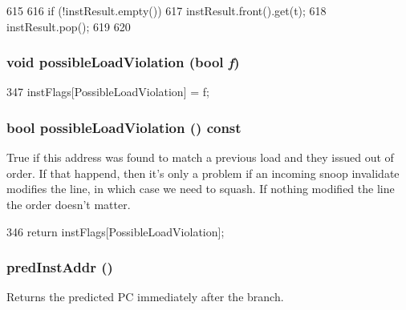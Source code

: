 \begin{DoxyCode}
615     {
616         if (!instResult.empty()) {
617             instResult.front().get(t);
618             instResult.pop();
619         }
620     }
\end{DoxyCode}
\hypertarget{classBaseDynInst_a7734c4cb05e0d0855b9cc931cfbf0166}{
\subsubsection[{possibleLoadViolation}]{\setlength{\rightskip}{0pt plus 5cm}void possibleLoadViolation (bool {\em f})}}
\label{classBaseDynInst_a7734c4cb05e0d0855b9cc931cfbf0166}



\begin{DoxyCode}
347 { instFlags[PossibleLoadViolation] = f; }
\end{DoxyCode}
\hypertarget{classBaseDynInst_afa40abf76b073fc08641ac2b8a9f96cd}{
\subsubsection[{possibleLoadViolation}]{\setlength{\rightskip}{0pt plus 5cm}bool possibleLoadViolation () const}}
\label{classBaseDynInst_afa40abf76b073fc08641ac2b8a9f96cd}
True if this address was found to match a previous load and they issued out of order. If that happend, then it's only a problem if an incoming snoop invalidate modifies the line, in which case we need to squash. If nothing modified the line the order doesn't matter. 


\begin{DoxyCode}
346 { return instFlags[PossibleLoadViolation]; }
\end{DoxyCode}
\hypertarget{classBaseDynInst_aaf7104129d287861faf7fe235f4116e7}{
\subsubsection[{predInstAddr}]{ predInstAddr ()}}
\label{classBaseDynInst_aaf7104129d287861faf7fe235f4116e7}
Returns the predicted PC immediately after the branch. 


